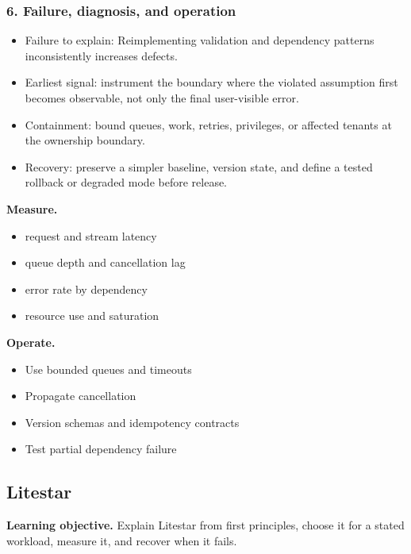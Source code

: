 \subsubsection*{6. Failure, diagnosis, and operation}
\begin{itemize}
\item Failure to explain: Reimplementing validation and dependency patterns inconsistently increases defects.
\item Earliest signal: instrument the boundary where the violated assumption first becomes observable, not only the final user-visible error.
\item Containment: bound queues, work, retries, privileges, or affected tenants at the ownership boundary.
\item Recovery: preserve a simpler baseline, version state, and define a tested rollback or degraded mode before release.
\end{itemize}
\textbf{Measure.}\begin{itemize}
\item request and stream latency
\item queue depth and cancellation lag
\item error rate by dependency
\item resource use and saturation
\end{itemize}
\textbf{Operate.}\begin{itemize}
\item Use bounded queues and timeouts
\item Propagate cancellation
\item Version schemas and idempotency contracts
\item Test partial dependency failure
\end{itemize}
\subsection{Litestar}
\textbf{Learning objective.} Explain Litestar from first principles, choose it for a stated workload, measure it, and recover when it fails.
